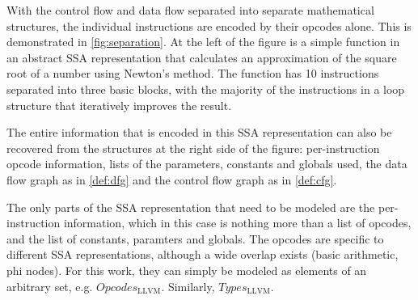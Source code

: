     With the control flow and data flow separated into separate mathematical
    structures, the individual instructions are encoded by their opcodes alone.
    This is demonstrated in \autoref{fig:separation}.
    At the left of the figure is a simple function in an abstract SSA
    representation that calculates an approximation of the square root of
    a number using Newton's method.
    The function has 10 instructions separated into three basic blocks, with the
    majority of the instructions in a loop structure that iteratively improves
    the result.

    The entire information that is encoded in this SSA representation can also
    be recovered from the structures at the right side of the figure:
    per-instruction opcode information, lists of the parameters, constants and
    globals used, the data flow graph as in \autoref{def:dfg} and the control
    flow graph as in \autoref{def:cfg}.

    The only parts of the SSA representation that need to be modeled are the
    per-instruction information, which in this case is nothing more than a list
    of opcodes, and the list of constants, paramters and globals.
    The opcodes are specific to different SSA representations, although a wide
    overlap exists (basic arithmetic, phi nodes).
    For this work, they can simply be modeled as elements of an arbitrary set,
    e.g. $Opcodes_\text{LLVM}$.
    Similarly, $Types_\text{LLVM}$.

